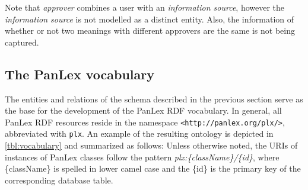 \documentclass[sw]{iosart2c}
\newcommand*{\origtodo}{}
\let\origtodo\todo
\renewcommand*{\todo}{\origtodo[inline]}
\begin{document}

Note that \emph{approver} combines a user with an \emph{information source},
however the \emph{information source} is not modelled as a distinct entity.
Also, the information of whether or not two meanings with different approvers
are the same is not being captured. 








\subsection{The PanLex vocabulary}
\label{sec:vocabulary}
The entities and relations of the schema described in the previous section
serve as the base for the development of the PanLex RDF vocabulary.
In general, all PanLex RDF resources reside
in the namespace \texttt{\small <http://panlex.org/plx/>}, abbreviated with \texttt{\small plx}.
An example of the resulting ontology is depicted in \autoref{tbl:vocabulary} and
summarized as follows:
Unless otherwise noted, the URIs of instances of PanLex classes follow the pattern
\emph{plx:\{className\}/\{id\}}, where \{className\} is spelled in lower camel case
and the \{id\} is the primary key of the corresponding database table.
\end{document}
